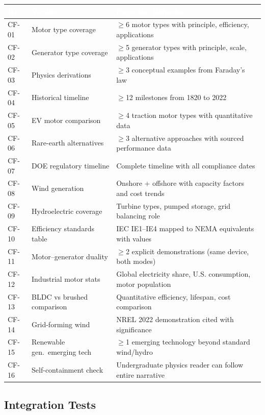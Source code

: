 \documentclass[11pt,letterpaper]{article}
\newcommand{\tableheader}[1]{\textbf{\sffamily\textcolor{white}{#1}}}
\begin{document}
\begin{center}
\begin{tabularx}{\textwidth}{C{1.2cm}L{3cm}X}
\toprule
{}
\tableheader{ID} & \tableheader{Verifies} & \tableheader{Expected Behavior} \\
\midrule
CF-01 & Motor type coverage & $\geq$6 motor types with principle, efficiency, applications \\
CF-02 & Generator type coverage & $\geq$5 generator types with principle, scale, applications \\
CF-03 & Physics derivations & $\geq$3 conceptual examples from Faraday's law \\
CF-04 & Historical timeline & $\geq$12 milestones from 1820 to 2022 \\
CF-05 & EV motor comparison & $\geq$4 traction motor types with quantitative data \\
CF-06 & Rare-earth alternatives & $\geq$3 alternative approaches with sourced performance data \\
CF-07 & DOE regulatory timeline & Complete timeline with all compliance dates \\
CF-08 & Wind generation & Onshore + offshore with capacity factors and cost trends \\
CF-09 & Hydroelectric coverage & Turbine types, pumped storage, grid balancing role \\
CF-10 & Efficiency standards table & IEC IE1--IE4 mapped to NEMA equivalents with values \\
CF-11 & Motor--generator duality & $\geq$2 explicit demonstrations (same device, both modes) \\
CF-12 & Industrial motor stats & Global electricity share, U.S. consumption, motor population \\
CF-13 & BLDC vs brushed comparison & Quantitative efficiency, lifespan, cost comparison \\
CF-14 & Grid-forming wind & NREL 2022 demonstration cited with significance \\
CF-15 & Renewable gen.\ emerging tech & $\geq$1 emerging technology beyond standard wind/hydro \\
CF-16 & Self-containment check & Undergraduate physics reader can follow entire narrative \\
\bottomrule
\end{tabularx}
\end{center}

\subsection{Integration Tests}
\end{document}
